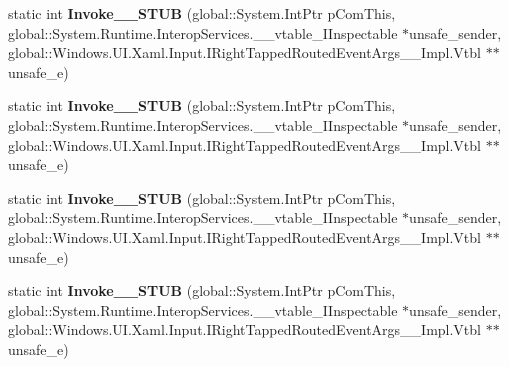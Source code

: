 \begin{DoxyCompactItemize}
\item 
\mbox{\label{struct_windows_1_1_u_i_1_1_xaml_1_1_input_1_1_right_tapped_event_handler_____impl_1_1_vtbl_aab72d66048527eeea1a50fdeab2def2d}} 
static int {\bfseries Invoke\+\_\+\+\_\+\+S\+T\+UB} (global\+::\+System.\+Int\+Ptr p\+Com\+This, global\+::\+System.\+Runtime.\+Interop\+Services.\+\_\+\+\_\+vtable\+\_\+\+I\+Inspectable $\ast$unsafe\+\_\+sender, global\+::\+Windows.\+U\+I.\+Xaml.\+Input.\+I\+Right\+Tapped\+Routed\+Event\+Args\+\_\+\+\_\+\+Impl.\+Vtbl $\ast$$\ast$unsafe\+\_\+e)
\item 
\mbox{\label{struct_windows_1_1_u_i_1_1_xaml_1_1_input_1_1_right_tapped_event_handler_____impl_1_1_vtbl_aab72d66048527eeea1a50fdeab2def2d}} 
static int {\bfseries Invoke\+\_\+\+\_\+\+S\+T\+UB} (global\+::\+System.\+Int\+Ptr p\+Com\+This, global\+::\+System.\+Runtime.\+Interop\+Services.\+\_\+\+\_\+vtable\+\_\+\+I\+Inspectable $\ast$unsafe\+\_\+sender, global\+::\+Windows.\+U\+I.\+Xaml.\+Input.\+I\+Right\+Tapped\+Routed\+Event\+Args\+\_\+\+\_\+\+Impl.\+Vtbl $\ast$$\ast$unsafe\+\_\+e)
\item 
\mbox{\label{struct_windows_1_1_u_i_1_1_xaml_1_1_input_1_1_right_tapped_event_handler_____impl_1_1_vtbl_aab72d66048527eeea1a50fdeab2def2d}} 
static int {\bfseries Invoke\+\_\+\+\_\+\+S\+T\+UB} (global\+::\+System.\+Int\+Ptr p\+Com\+This, global\+::\+System.\+Runtime.\+Interop\+Services.\+\_\+\+\_\+vtable\+\_\+\+I\+Inspectable $\ast$unsafe\+\_\+sender, global\+::\+Windows.\+U\+I.\+Xaml.\+Input.\+I\+Right\+Tapped\+Routed\+Event\+Args\+\_\+\+\_\+\+Impl.\+Vtbl $\ast$$\ast$unsafe\+\_\+e)
\item 
\mbox{\label{struct_windows_1_1_u_i_1_1_xaml_1_1_input_1_1_right_tapped_event_handler_____impl_1_1_vtbl_aab72d66048527eeea1a50fdeab2def2d}} 
static int {\bfseries Invoke\+\_\+\+\_\+\+S\+T\+UB} (global\+::\+System.\+Int\+Ptr p\+Com\+This, global\+::\+System.\+Runtime.\+Interop\+Services.\+\_\+\+\_\+vtable\+\_\+\+I\+Inspectable $\ast$unsafe\+\_\+sender, global\+::\+Windows.\+U\+I.\+Xaml.\+Input.\+I\+Right\+Tapped\+Routed\+Event\+Args\+\_\+\+\_\+\+Impl.\+Vtbl $\ast$$\ast$unsafe\+\_\+e)

\end{DoxyCompactItemize}
